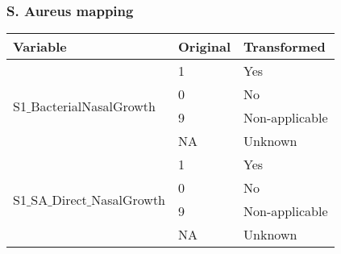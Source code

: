\subsubsection{S. Aureus mapping}

\begin{table}[H]

	\tiny

	\centering

    \label{table:Table_SA_Transform_Categories}
    
	\renewcommand{\arraystretch}{1.5}

    \begin{tabular}{l | l | l}
		\hline
        \rowcolor[HTML]{FF9999}		
		
        \textbf{Variable} & \textbf{Original} & \textbf{Transformed} \\ 		
        
        \hline 

            \multirow{4}{*}{S1$\_$BacterialNasalGrowth}
                                         & \multicolumn{1}{l}{1}     & \multicolumn{1}{l}{Yes}            \\\cline{2-3}
                                         & \multicolumn{1}{l}{0}     & \multicolumn{1}{l}{No}             \\\cline{2-3}
                                         & \multicolumn{1}{l}{9}     & \multicolumn{1}{l}{Non-applicable} \\\cline{2-3}
                                         & \multicolumn{1}{l}{NA}    & \multicolumn{1}{l}{Unknown}        \\\hline
                                    
            \multirow{4}{*}{S1$\_$SA$\_$Direct$\_$NasalGrowth} 
                                         & \multicolumn{1}{l}{1}     & \multicolumn{1}{l}{Yes}            \\\cline{2-3}
                                         & \multicolumn{1}{l}{0}     & \multicolumn{1}{l}{No}             \\\cline{2-3}
                                         & \multicolumn{1}{l}{9}     & \multicolumn{1}{l}{Non-applicable} \\\cline{2-3}
                                         & \multicolumn{1}{l}{NA}    & \multicolumn{1}{l}{Unknown}        \\\hline


\end{tabular}
\end{table}
